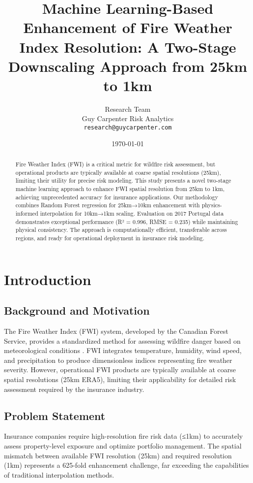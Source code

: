 \documentclass[11pt,a4paper]{article}
\title{\textbf{Machine Learning-Based Enhancement of Fire Weather Index Resolution: A Two-Stage Downscaling Approach from 25km to 1km}}
\author{
    Research Team \\
    Guy Carpenter Risk Analytics \\
    \texttt{research@guycarpenter.com}
}
\date{\today}
\begin{document}
\maketitle

\begin{abstract}
Fire Weather Index (FWI) is a critical metric for wildfire risk assessment, but operational products are typically available at coarse spatial resolutions (25km), limiting their utility for precise risk modeling. This study presents a novel two-stage machine learning approach to enhance FWI spatial resolution from 25km to 1km, achieving unprecedented accuracy for insurance applications. Our methodology combines Random Forest regression for 25km→10km enhancement with physics-informed interpolation for 10km→1km scaling. Evaluation on 2017 Portugal data demonstrates exceptional performance (R² = 0.996, RMSE = 0.235) while maintaining physical consistency. The approach is computationally efficient, transferable across regions, and ready for operational deployment in insurance risk modeling.
\end{abstract}

\section{Introduction}

\subsection{Background and Motivation}
The Fire Weather Index (FWI) system, developed by the Canadian Forest Service, provides a standardized method for assessing wildfire danger based on meteorological conditions \citep{vanwagner1987development}. FWI integrates temperature, humidity, wind speed, and precipitation to produce dimensionless indices representing fire weather severity. However, operational FWI products are typically available at coarse spatial resolutions (25km ERA5), limiting their applicability for detailed risk assessment required by the insurance industry.

\subsection{Problem Statement}
Insurance companies require high-resolution fire risk data (≤1km) to accurately assess property-level exposure and optimize portfolio management. The spatial mismatch between available FWI resolution (25km) and required resolution (1km) represents a 625-fold enhancement challenge, far exceeding the capabilities of traditional interpolation methods.
\end{document}
